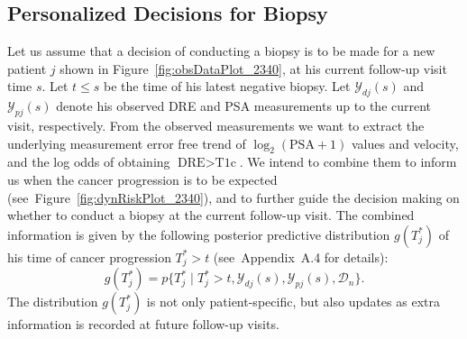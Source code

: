 
\subsection{Personalized Decisions for Biopsy}
\label{subsec:pers_decision_making}
Let us assume that a decision of conducting a biopsy is to be made for a new patient $j$ shown in Figure~\ref{fig:obsDataPlot_2340}, at his current follow-up visit time $s$. Let $t\leq s$ be the time of his latest negative biopsy. Let $\mathcal{Y}_{dj}(s)$ and $\mathcal{Y}_{pj}(s)$ denote his observed DRE and PSA measurements up to the current visit, respectively. From the observed measurements we want to extract the underlying measurement error free trend of $\log_2 (\mbox{PSA} + 1)$ values and velocity, and the log odds of obtaining $\mbox{DRE} > \mbox{T1c}$. We intend to combine them to inform us when the cancer progression is to be expected (see~Figure~\ref{fig:dynRiskPlot_2340}), and to further guide the decision making on whether to conduct a biopsy at the current follow-up visit. The combined information is given by the following posterior predictive distribution $g(T^*_j)$ of his time of cancer progression $T^*_j > t$ (see~Appendix~A.4 for details):
\begin{equation}
\label{eq:post_pred_dist}
g(T^*_j) = p\big\{T^*_j \mid T^*_j > t, \mathcal{Y}_{dj}(s), \mathcal{Y}_{pj}(s), \mathcal{D}_n\big\}.
\end{equation}
The distribution $g(T^*_j)$ is not only patient-specific, but also updates as extra information is recorded at future follow-up visits.

